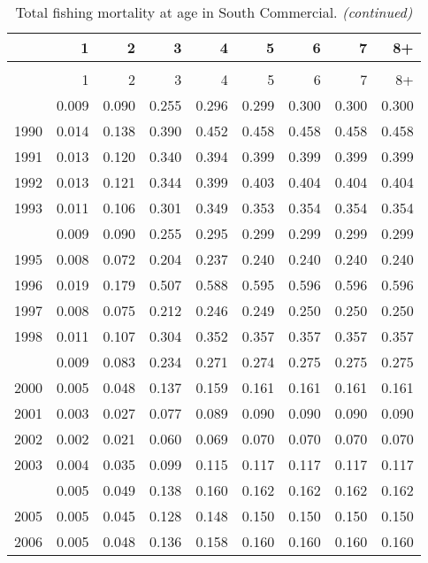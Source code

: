 \documentclass[
]{article}
\begin{document}
\begin{longtable}[t]{lrrrrrrrr}
\caption{\label{tab:South_Commercial-fleet-FAA-table}Total fishing mortality at age in South Commercial.}\\
\toprule
  & 1 & 2 & 3 & 4 & 5 & 6 & 7 & 8+\\
\midrule
\endfirsthead
\caption[]{Total fishing mortality at age in South Commercial. \textit{(continued)}}\\
\toprule
  & 1 & 2 & 3 & 4 & 5 & 6 & 7 & 8+\\
\midrule
\endhead

\endfoot
\bottomrule
\endlastfoot
1989 & 0.009 & 0.090 & 0.255 & 0.296 & 0.299 & 0.300 & 0.300 & 0.300\\
1990 & 0.014 & 0.138 & 0.390 & 0.452 & 0.458 & 0.458 & 0.458 & 0.458\\
1991 & 0.013 & 0.120 & 0.340 & 0.394 & 0.399 & 0.399 & 0.399 & 0.399\\
1992 & 0.013 & 0.121 & 0.344 & 0.399 & 0.403 & 0.404 & 0.404 & 0.404\\
1993 & 0.011 & 0.106 & 0.301 & 0.349 & 0.353 & 0.354 & 0.354 & 0.354\\
\addlinespace
1994 & 0.009 & 0.090 & 0.255 & 0.295 & 0.299 & 0.299 & 0.299 & 0.299\\
1995 & 0.008 & 0.072 & 0.204 & 0.237 & 0.240 & 0.240 & 0.240 & 0.240\\
1996 & 0.019 & 0.179 & 0.507 & 0.588 & 0.595 & 0.596 & 0.596 & 0.596\\
1997 & 0.008 & 0.075 & 0.212 & 0.246 & 0.249 & 0.250 & 0.250 & 0.250\\
1998 & 0.011 & 0.107 & 0.304 & 0.352 & 0.357 & 0.357 & 0.357 & 0.357\\
\addlinespace
1999 & 0.009 & 0.083 & 0.234 & 0.271 & 0.274 & 0.275 & 0.275 & 0.275\\
2000 & 0.005 & 0.048 & 0.137 & 0.159 & 0.161 & 0.161 & 0.161 & 0.161\\
2001 & 0.003 & 0.027 & 0.077 & 0.089 & 0.090 & 0.090 & 0.090 & 0.090\\
2002 & 0.002 & 0.021 & 0.060 & 0.069 & 0.070 & 0.070 & 0.070 & 0.070\\
2003 & 0.004 & 0.035 & 0.099 & 0.115 & 0.117 & 0.117 & 0.117 & 0.117\\
\addlinespace
2004 & 0.005 & 0.049 & 0.138 & 0.160 & 0.162 & 0.162 & 0.162 & 0.162\\
2005 & 0.005 & 0.045 & 0.128 & 0.148 & 0.150 & 0.150 & 0.150 & 0.150\\
2006 & 0.005 & 0.048 & 0.136 & 0.158 & 0.160 & 0.160 & 0.160 & 0.160\\

\end{longtable}
\end{document}
